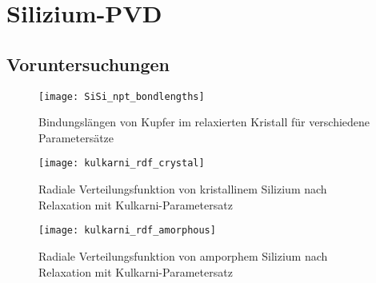 \chapter{Silizium-PVD}
\label{appendix:silicon}

\section{Voruntersuchungen}

\begin{figure}
  \centering
  \texttt{[image: SiSi\_npt\_bondlengths]}
  \caption[Bindungslängen von Kupfer im relaxierten Kristall für verschiedene Parametersätze]{Bindungslängen von Kupfer im relaxierten Kristall für verschiedene Parametersätze}
  \label{fig:sisibondlengths}
\end{figure}

\begin{figure}
  \centering
  \texttt{[image: kulkarni\_rdf\_crystal]}
  \caption[Radiale Verteilungsfunktion von kristallinem Silizium nach Relaxation mit Kulkarni-Parametersatz]{Radiale Verteilungsfunktion von kristallinem Silizium nach Relaxation mit Kulkarni-Parametersatz}
  \label{fig:kulkarnirdf}
\end{figure}

\begin{figure}
  \centering
  \texttt{[image: kulkarni\_rdf\_amorphous]}
  \caption[Radiale Verteilungsfunktion von amorphem Silizium nach Relaxation mit Kulkarni-Parametersatz]{Radiale Verteilungsfunktion von amporphem Silizium nach Relaxation mit Kulkarni-Parametersatz}
  \label{fig:amorphousrdf}
\end{figure}

